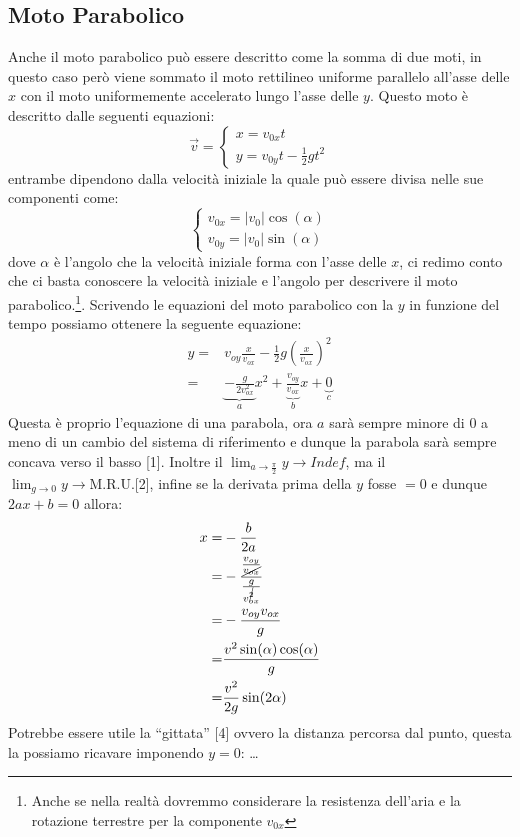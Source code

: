     \subsection{Moto Parabolico}
        Anche il moto parabolico può essere descritto come la somma di due moti, in questo caso però viene sommato il moto rettilineo uniforme parallelo all'asse delle $x$ con il moto uniformemente accelerato lungo l'asse delle $y$. Questo moto è descritto dalle seguenti equazioni:
        $$
            \vec{v}=\begin{cases}
                x=v_{0x}t\\
                y=v_{0y}t-\frac{1}{2}gt^2
            \end{cases}
        $$
        entrambe dipendono dalla velocità iniziale la quale può essere divisa nelle sue componenti come:
        $$
            \begin{cases}
                v_{0x} = |v_0|\cos(\alpha)\\
                v_{0y} = |v_0|\sin(\alpha)
            \end{cases}
        $$
        dove $\alpha$ è l'angolo che la velocità iniziale forma con l'asse delle $x$, ci redimo conto che ci basta conoscere la velocità iniziale e l'angolo per descrivere il moto parabolico.\footnote{Anche se nella realtà dovremmo considerare la resistenza dell'aria e la rotazione terrestre per la componente $v_{0x}$}.\newline
        Scrivendo le equazioni del moto parabolico con la $y$ in funzione del tempo possiamo ottenere la seguente equazione:
        $$
            \begin{aligned}
                y=&v_{oy}\frac{x}{v_{ox}}-\frac12g\left(\frac{x}{v_{ox}}\right)^2\\
                =&\underbrace{-\frac{g}{2v_{ox}^2}}_{a}x^2+\underbrace{\frac{v_{oy}}{v_{ox}}}_{b}x+\underbrace{0}_{c}
            \end{aligned}
        $$
        Questa è proprio l'equazione di una parabola, ora $a$ sarà sempre minore di $0$ a meno di un cambio del sistema di riferimento e dunque la parabola sarà sempre concava verso il basso [1].\newline
        Inoltre il $\lim_{ a\to \frac{\pi}2}y\rightarrow Indef$, ma il $\lim_{ g\to 0}y\rightarrow \text{M.R.U.}$[2], infine se la derivata prima della $y$ fosse $=0$ e dunque $2ax+b=0$ allora:
        $$
            \begin{aligned}
                x=&-\frac{b}{2a}\\
                =&-\frac{\frac{v_{oy}}{\cancel{v_{ox}}}}{\frac{g}{v_{ox}^{\cancel{2}}}}\\
                =&-\frac{v_{oy}v_{ox}}{g}\\
                =&\frac{v^2\sin(\alpha)\cos(\alpha)}{g}\\
                =&\frac{v^2}{2g}\sin(2\alpha)
            \end{aligned}
        $$
        Potrebbe essere utile la ``gittata'' [4] ovvero la distanza percorsa dal punto, questa la possiamo ricavare imponendo $y=0$: \dots
